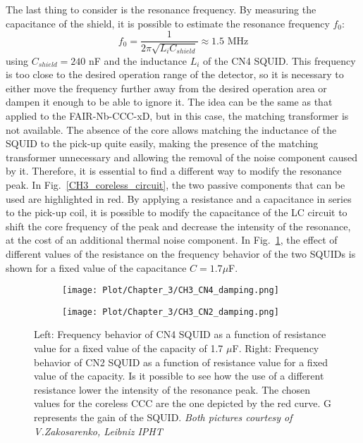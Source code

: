 \documentclass[12pt,a4paper]{report}
\begin{document}
       The last thing to consider is the resonance frequency. By measuring the capacitance of the shield, it is possible to estimate the resonance frequency $f_0$:
       \begin{equation}
       	f_0 = \frac{1}{2\pi\sqrt{L_i C_{shield}}} \approx 1.5 \text{ MHz}
       \end{equation}
       using $C_{shield} = 240$ nF and the inductance $L_i$ of the CN4 SQUID. This frequency is too close to the desired operation range of the detector, so it is necessary to either move the frequency further away from the desired operation area or dampen it enough to be able to ignore it. The idea can be the same as that applied to the FAIR-Nb-CCC-xD, but in this case, the matching transformer is not available. The absence of the core allows matching the inductance of the SQUID to the pick-up quite easily, making the presence of the matching transformer unnecessary and allowing the removal of the noise component caused by it. Therefore, it is essential to find a different way to modify the resonance peak. In Fig.~\ref{CH3_coreless_circuit}, the two passive components that can be used are highlighted in red. By applying a resistance and a capacitance in series to the pick-up coil, it is possible to modify the capacitance of the LC circuit to shift the core frequency of the peak and decrease the intensity of the resonance, at the cost of an additional thermal noise component. In Fig.~\ref{CH3_Coreless_bandwidth}, the effect of different values of the resistance on the frequency behavior of the two SQUIDs is shown for a fixed value of the capacitance $C = 1.7 \mu$F.
       \begin{figure}[H]
       	\begin{subfigure}[b]{0.48\textwidth}
       		\centering
       		\texttt{[image: Plot/Chapter\_3/CH3\_CN4\_damping.png]}
       	\end{subfigure}
       	\hfill
       	\begin{subfigure}[b]{0.48\textwidth}
       		\centering
       		\texttt{[image: Plot/Chapter\_3/CH3\_CN2\_damping.png]}
       	\end{subfigure}
       	\caption{\small{Left: Frequency behavior of CN4 SQUID as a function of resistance value for a fixed value of the capacity of 1.7 $\mu$F. Right: Frequency behavior of CN2 SQUID as a function of resistance value for a fixed value of the capacity. Is it possible to see how the use of a different resistance lower the intensity of the resonance peak. The chosen values for the coreless CCC are the one depicted by the red curve. G represents the gain of the SQUID. \textit{Both pictures courtesy of V.Zakosarenko, Leibniz IPHT}}}
       	\label{CH3_Coreless_bandwidth}
       \end{figure}
\end{document}
